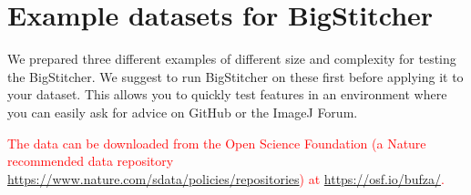 \documentclass[]{spie}  %
\begin{document}
\begin{landscape}
\begin{figure}[h!]
{}
\label{tab:benchmarks}
\end{figure}

\end{landscape}
\pagebreak







\section{Example datasets for BigStitcher}
\label{sec:example}

We prepared three different examples of different size and complexity for testing the BigStitcher. We suggest to run BigStitcher on these first before applying it to your dataset. This allows you to quickly test features in an environment where you can easily ask for advice on GitHub or the ImageJ Forum.

\textcolor{red}{The data can be downloaded from the Open Science Foundation (a Nature recommended data repository \url{https://www.nature.com/sdata/policies/repositories}) at \url{https://osf.io/bufza/}.}
\end{document}
